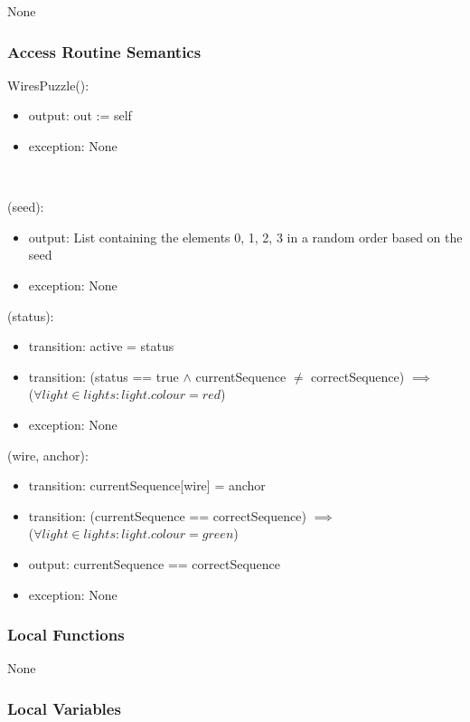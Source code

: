 \documentclass[12pt, titlepage]{article}
\begin{document}
None

\subsubsection{Access Routine Semantics}

\noindent WiresPuzzle():
\begin{itemize}
\item output: out := self
\item exception: None
\end{itemize}\

(seed):
\begin{itemize}
\item output: List containing the elements {0, 1, 2, 3} in a random order based on the seed
\item exception: None
\end{itemize}

(status):
\begin{itemize}
\item transition: active = status
\item transition: (status == true $\land$ currentSequence $\neq$ correctSequence) $\implies$\\ ($\forall light \in lights: light.colour = red$)
\item exception: None
\end{itemize}

(wire, anchor):
\begin{itemize}
\item transition: currentSequence[wire] = anchor
\item transition: (currentSequence == correctSequence) $\implies$\\ ($\forall light \in lights: light.colour = green$)
\item output: currentSequence == correctSequence
\item exception: None
\end{itemize}

\subsubsection{Local Functions}

None

\subsubsection{Local Variables}
\end{document}
